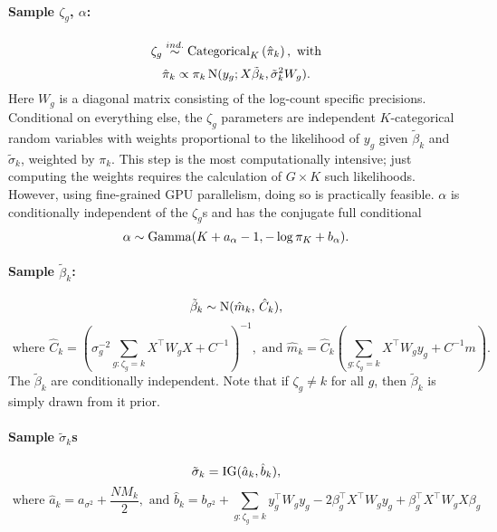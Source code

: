\paragraph{Sample $\zeta_g$, $\alpha$:}

\begin{equation*}
\zeta_g \stackrel{ind.}{\sim} \operatorname{Categorical}_K\left(\hat{\pi}_k \right), \mbox{ with}
\end{equation*}
\begin{equation*}
\hat{\pi}_k \propto \pi_k \operatorname{N}(y_g;X\tilde{\beta}_k,\tilde{\sigma}_k^2 W_g).
\end{equation*}
Here $W_g$ is a diagonal matrix consisting of the log-count specific precisions. Conditional on everything else, the $\zeta_g$ parameters are independent $K$-categorical random variables with weights proportional to the likelihood of $y_g$ given $\tilde{\beta}_k$ and $\tilde{\sigma}_k$, weighted by $\pi_k$. This step is the most computationally intensive; just computing the weights requires the calculation of $G\times K$ such likelihoods. However, using fine-grained GPU parallelism, doing so is practically feasible. $\alpha$ is conditionally independent of the $\zeta_g$s and has the conjugate full conditional
\begin{equation*}
\alpha \sim \operatorname{Gamma}(K + a_\alpha - 1, -\log \pi_K + b_\alpha).
\end{equation*}


\paragraph{Sample $\tilde{\beta}_k$:}
\begin{equation*}
\tilde{\beta}_k \sim \operatorname{N}(\hat{m}_k,\, \hat{C}_k),
\end{equation*}
\begin{equation*}
\mbox{ where }\hat{C}_k= \left( \sigma^{-2}_g\sum_{g:\zeta_g=k}
  X^\top W_g X + C^{-1} \right)^{-1}, \mbox{ and }\hat{m}_k=\hat{C}_k \left(\sum_{g:\zeta_g=k} X^\top W_g y_g +
      C^{-1}m \right).
\end{equation*}
The $\tilde{\beta}_k$ are conditionally independent. Note that if $\zeta_g \neq k$ for all $g$, then $\tilde{\beta}_k$ is simply drawn from it prior. 

\paragraph{Sample $\tilde{\sigma}_k$s}
\begin{equation*}
      \tilde{\sigma}_k = \operatorname{IG}(\hat{a}_k,\hat{b}_k), 
    \end{equation*}
    \begin{equation*}
      \mbox{ where }\hat{a}_k = a_{\sigma^2} + \frac{NM_k}{2},\mbox{ and }\hat{b}_k= b_{\sigma^2} + \sum_{g:\zeta_g=k}y_g^\top W_g y_g -2 \beta_g^\top X^\top W_g y_g  +\beta_g^\top X^\top W_g X \beta_g
    \end{equation*}

